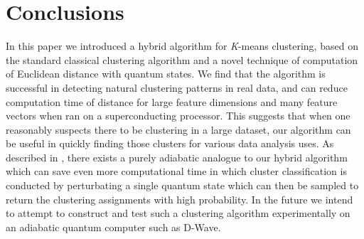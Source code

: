 \documentclass[twocolumn, english]{revtex4-2}
\begin{document}
\section{Conclusions}
In this paper we introduced a hybrid algorithm for \textit{K}-means clustering, based on the standard classical clustering algorithm and a novel technique of computation of Euclidean distance with quantum states. We find that the algorithm is successful in detecting natural clustering patterns in real data, and can reduce computation time of distance for large feature dimensions and many feature vectors when ran on a superconducting processor. This suggests that when one reasonably suspects there to be clustering in a large dataset, our algorithm can be useful in quickly finding those clusters for various data analysis uses. As described in \cite{lloydlearning}, there exists a purely adiabatic analogue to our hybrid algorithm which can save even more computational time in which cluster classification is conducted by perturbating a single quantum state which can then be sampled to return the clustering assignments with high probability. In the future we intend to attempt to construct and test such a clustering algorithm experimentally on an adiabatic quantum computer such as D-Wave.

{}
\end{document}
